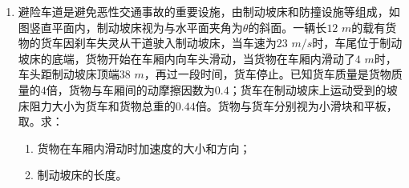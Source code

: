 \begin{enumerate}[leftmargin=0em]
{\begin{enumerate}
\end{enumerate}


}


\newpage





\item 
{}
避险车道是避免恶性交通事故的重要设施，由制动坡床和防撞设施等组成，如图竖直平面内，制动坡床视为与水平面夹角为$ \theta $的斜面。一辆长$ 12 $ $ m $的载有货物的货车因刹车失灵从干道驶入制动坡床，当车速为$ 23 $ $ m/s $时，车尾位于制动坡床的底端，货物开始在车厢内向车头滑动，当货物在车厢内滑动了$ 4 $ $ m $时，车头距制动坡床顶端$ 38 $ $ m $，再过一段时间，货车停止。已知货车质量是货物质量的$ 4 $倍，货物与车厢间的动摩擦因数为$ 0.4 $；货车在制动坡床上运动受到的坡床阻力大小为货车和货物总重的$ 0.44 $倍。货物与货车分别视为小滑块和平板，取。求：
\begin{enumerate}
\renewcommand{\labelenumi}{\arabic{enumi}.}
\item
货物在车厢内滑动时加速度的大小和方向；
\item 
制动坡床的长度。

\end{enumerate}		
\begin{figure}[h!]
\flushright

\end{figure}





\end{enumerate}
